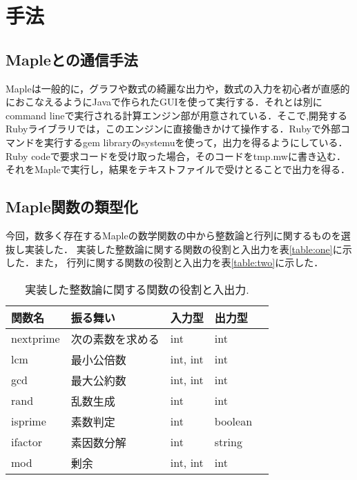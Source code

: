 \documentclass[10pt,a4j]{article}
\begin{document}
\section{手法}
\subsection{Mapleとの通信手法}
Mapleは一般的に，グラフや数式の綺麗な出力や，数式の入力を初心者が直感的におこなえるようにJavaで作られたGUIを使って実行する．それとは別にcommand lineで実行される計算エンジン部が用意されている．そこで,開発するRubyライブラリでは，このエンジンに直接働きかけて操作する．Rubyで外部コマンドを実行するgem libraryのsystemuを使って，出力を得るようにしている．Ruby codeで要求コードを受け取った場合，そのコードをtmp.mwに書き込む．それをMapleで実行し，結果をテキストファイルで受けとることで出力を得る．

\subsection{Maple関数の類型化}
今回，数多く存在するMapleの数学関数の中から整数論と行列に関するものを選抜し実装した．
実装した整数論に関する関数の役割と入出力を表\ref{table:one}に示した．また，
行列に関する関数の役割と入出力を表\ref{table:two}に示した．

\begin{table}[htbp]\begin{center}
\caption{実装した整数論に関する関数の役割と入出力.}
\label{table:one}
\begin{tabular}{lllll}
\hline
関数名  &振る舞い  &入力型  &出力型  \\ \hline
nextprime  &次の素数を求める  &int  &int  \\
lcm  &最小公倍数  &int, int  &int  \\
gcd  &最大公約数  &int, int  &int  \\
rand  &乱数生成  &int  &int  \\
isprime  &素数判定  &int  &boolean  \\
ifactor  &素因数分解  &int  &string  \\
mod  &剰余  &int, int  &int  \\
\hline
\end{tabular}
\label{default}
\end{center}\end{table}
\end{document}
